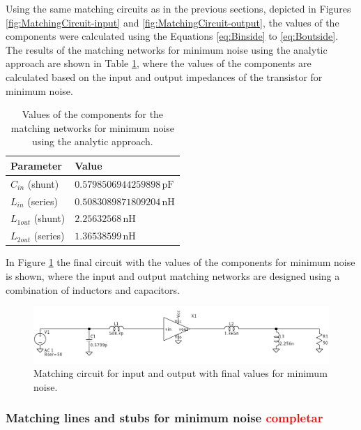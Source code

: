 Using the same matching circuits as in the previous sections, depicted in Figures \ref{fig:MatchingCircuit-input} and \ref{fig:MatchingCircuit-output}, the values of the components were calculated using the Equations \ref{eq:Binside} to \ref{eq:Boutside}.
The results of the matching networks for minimum noise using the analytic approach are shown in Table \ref{tab:MatchingValues-noise}, where the values of the components are calculated based on the input and output impedances of the transistor for minimum noise.
\begin{table}[H]
    \centering
    \caption{Values of the components for the matching networks for minimum noise using the analytic approach.}
    \begin{tabularx}{\textwidth}{>{\centering\arraybackslash}X >{\centering\arraybackslash}X}
        \toprule
        \textbf{Parameter} & \textbf{Value} \\
        \midrule
        $C_{in}$ \quad (shunt)    & $0.5798506944259898\,\si{\pico\farad}$ \\
        \midrule
        $L_{in}$  \quad(series)   & $0.5083089871809204\,\si{\nano\henry}$\\
        \midrule
        $L_{1out}$ \quad (shunt)   & $2.25632568\,\si{\nano\henry}$ \\
        \midrule
        $L_{2out}$ \quad (series)   & $1.36538599\,\si{\nano\henry}$\\
        \bottomrule
    \end{tabularx}
    \label{tab:MatchingValues-noise}
\end{table}

In Figure \ref{fig:MatchingCircuit-noise} the final circuit with the values of the components for minimum noise is shown, where the input and output matching networks are designed using a combination of inductors and capacitors.
\begin{figure}[H]
    \centering
    \includegraphics[width=1\textwidth]{Images/LC-noise-matching-circuit.png}
    \caption{Matching circuit for input and output with final values for minimum noise.}
    \label{fig:MatchingCircuit-noise}
\end{figure}

\subsubsection{Matching lines and stubs for minimum noise \textcolor{red}{completar}}

